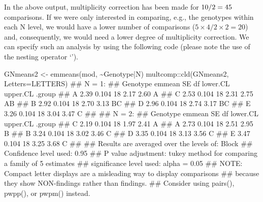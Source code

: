 \documentclass[a4paper,12pt,oneside]{book}
\newenvironment{Shaded}{\begin{snugshade}}{\end{snugshade}}
\newcommand{\SpecialCharTok}[1]{#1}
\newcommand{\DocumentationTok}[1]{#1}
\newcommand{\OtherTok}[1]{#1}
\newcommand{\FunctionTok}[1]{#1}
\newcommand{\AttributeTok}[1]{#1}
\newcommand{\AlertTok}[1]{#1}
\newcommand{\NormalTok}[1]{#1}
\begin{document}
In the above output, multiplicity correction has been made for \(10 \time 9 / 2 = 45\) comparisons. If we were only interested in comparing, e.g., the genotypes within each N level, we would have a lower number of comparisons (\(5 \times 4/2 \times 2 = 20\)) and, consequently, we would need a lower degree of multiplicity correction. We can specify such an analysis by using the following code (please note the use of the nesting operator `\textbar{}').

\vspace{12pt}

\begin{Shaded}
\begin{Highlighting}[]
\NormalTok{GNmeans2 }\OtherTok{\textless{}{-}} \FunctionTok{emmeans}\NormalTok{(mod, }\SpecialCharTok{\textasciitilde{}}\NormalTok{Genotype}\SpecialCharTok{|}\NormalTok{N)}
\NormalTok{multcomp}\SpecialCharTok{::}\FunctionTok{cld}\NormalTok{(GNmeans2, }\AttributeTok{Letters=}\NormalTok{LETTERS)}
\DocumentationTok{\#\# N = 1:}
\DocumentationTok{\#\#  Genotype emmean    SE df lower.CL upper.CL .group}
\DocumentationTok{\#\#  A          2.39 0.104 18     2.17     2.60  A    }
\DocumentationTok{\#\#  C          2.53 0.104 18     2.31     2.75  AB   }
\DocumentationTok{\#\#  B          2.92 0.104 18     2.70     3.13   BC  }
\DocumentationTok{\#\#  D          2.96 0.104 18     2.74     3.17   BC  }
\DocumentationTok{\#\#  E          3.26 0.104 18     3.04     3.47    C  }
\DocumentationTok{\#\# }
\DocumentationTok{\#\# N = 2:}
\DocumentationTok{\#\#  Genotype emmean    SE df lower.CL upper.CL .group}
\DocumentationTok{\#\#  C          2.19 0.104 18     1.97     2.41  A    }
\DocumentationTok{\#\#  A          2.73 0.104 18     2.51     2.95   B   }
\DocumentationTok{\#\#  B          3.24 0.104 18     3.02     3.46    C  }
\DocumentationTok{\#\#  D          3.35 0.104 18     3.13     3.56    C  }
\DocumentationTok{\#\#  E          3.47 0.104 18     3.25     3.68    C  }
\DocumentationTok{\#\# }
\DocumentationTok{\#\# Results are averaged over the levels of: Block }
\DocumentationTok{\#\# Confidence level used: 0.95 }
\DocumentationTok{\#\# P value adjustment: tukey method for comparing a family of 5 estimates }
\DocumentationTok{\#\# significance level used: alpha = 0.05 }
\DocumentationTok{\#\# }\AlertTok{NOTE}\DocumentationTok{: Compact letter displays are a misleading way to display comparisons}
\DocumentationTok{\#\#       because they show NON{-}findings rather than findings.}
\DocumentationTok{\#\#       Consider using \textquotesingle{}pairs()\textquotesingle{}, \textquotesingle{}pwpp()\textquotesingle{}, or \textquotesingle{}pwpm()\textquotesingle{} instead.}
\end{Highlighting}
\end{Shaded}
\end{document}
